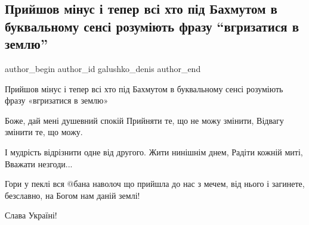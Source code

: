  
 
 
 
 
 
\subsection{Прийшов мінус і тепер всі хто під Бахмутом в буквальному сенсі розуміють фразу \enquote{вгризатися в землю}}
\label{sec:08_01_2023.fb.galushko_denis.1.bahmut_prijshov_minus}
 
\ifcmt
 author_begin
   author_id galushko_denis
 author_end
\fi

Прийшов мінус і тепер всі хто під Бахмутом в буквальному сенсі розуміють фразу
«вгризатися в землю»

Боже, дай мені душевний спокій  Прийняти те, що не можу змінити, Відвагу
змінити те, що можу.

І мудрість відрізнити одне від другого. Жити нинішнім днем, Радіти кожній миті,
Вважати незгоди...

Гори у пеклі вся @бана наволоч що прийшла до нас з мечем, від нього і загинете,
безславно, на Богом нам даній землі!

Слава Україні!
